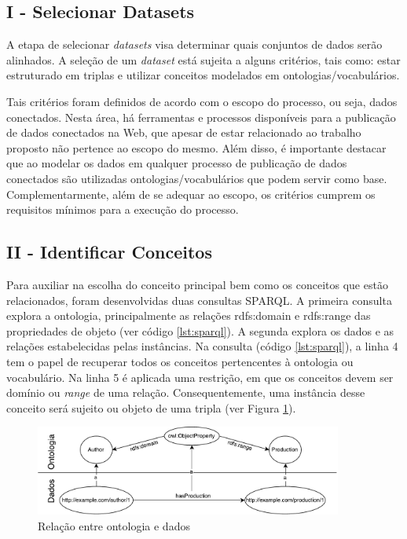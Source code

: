 \subsection{I - Selecionar Datasets}
A etapa de selecionar \textit{datasets} visa determinar quais conjuntos de dados serão alinhados. A seleção de um \textit{dataset} está sujeita a alguns critérios, tais como: estar estruturado em triplas e utilizar conceitos modelados em ontologias/vocabulários. 

Tais critérios foram definidos de acordo com o escopo do processo, ou seja, dados conectados. Nesta área, há ferramentas e processos disponíveis para a publicação de dados conectados na Web, que apesar de estar relacionado ao trabalho proposto não pertence ao escopo do mesmo. Além disso, é importante destacar que ao modelar os dados em qualquer processo de publicação de dados conectados são utilizadas ontologias/vocabulários que podem servir como base. Complementarmente, além de se adequar ao escopo, os critérios cumprem os requisitos mínimos para a execução do processo. 

\subsection{II - Identificar Conceitos}
\label{sec:prop_identificar}
Para auxiliar na escolha do conceito principal bem como os conceitos que estão relacionados, foram desenvolvidas duas consultas SPARQL. A primeira consulta explora a ontologia, principalmente as relações rdfs:domain e rdfs:range das propriedades de objeto (ver código \ref{lst:sparql}). A segunda explora os dados e as relações estabelecidas pelas instâncias.
Na consulta (código \ref{lst:sparql}), a linha 4 tem o papel de recuperar todos os conceitos pertencentes à ontologia ou vocabulário. Na linha 5 é aplicada uma restrição, em que os conceitos devem ser domínio ou \textit{range} de uma relação. Consequentemente, uma instância desse conceito será sujeito ou objeto de uma tripla (ver Figura \ref{fig:subgrafo1}).
% 
% 
%
%
\begin{figure}[!h]
	\centering
	\includegraphics[width=0.9\textwidth]{./imagens/subgrafo_semantico.pdf}
	\caption{Relação entre ontologia e dados}
	\label{fig:subgrafo1}
\end{figure}

